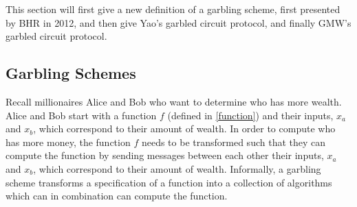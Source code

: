 \documentclass[12pt,twoside]{reedthesis}
\begin{document}
This section will first give a new definition of a garbling scheme, first presented by BHR in 2012, and then give Yao's garbled circuit protocol, and finally GMW's garbled circuit protocol.

\subsection{Garbling Schemes}
Recall millionaires Alice and Bob who want to determine who has more wealth.
Alice and Bob start with a function $f$ (defined in \ref{function}) and their inputs, $x_a$ and $x_b$, which correspond to their amount of wealth.
In order to compute who has more money, the function $f$ needs to be transformed such that they can compute the function by sending messages between each other their inputs, $x_a$ and $x_b$, which correspond to their amount of wealth.
Informally, a garbling scheme transforms a specification of a function into a collection of algorithms which can in combination can compute the function.
\end{document}
